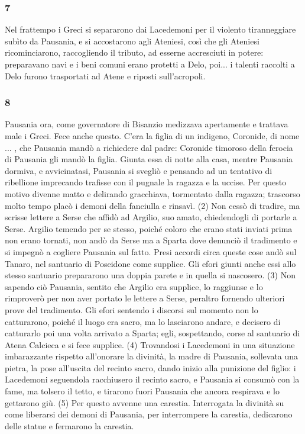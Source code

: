 \subsubsection*{7} Nel frattempo i Greci si separarono dai Lacedemoni per il violento tiranneggiare subìto da Pausania, e si accostarono agli Ateniesi, così che gli Ateniesi ricominciarono, raccogliendo il tributo, ad esserne accresciuti in potere: preparavano navi e i beni comuni erano protetti a Delo, poi... i talenti raccolti a Delo furono trasportati ad Atene e riposti sull'acropoli. 

\subsubsection*{8} Pausania ora, come governatore di Bisanzio medizzava apertamente e trattava male i Greci. Fece anche questo. C'era la figlia di un indigeno, Coronide, di nome ... , che Pausania mandò a richiedere dal padre: Coronide timoroso della ferocia di Pausania gli mandò la figlia. Giunta essa di notte alla casa, mentre Pausania dormiva, e avvicinatasi, Pausania si svegliò e pensando ad un tentativo di ribellione imprecando trafisse con il pugnale la ragazza e la uccise. Per questo motivo divenne matto e delirando gracchiava, tormentato dalla ragazza; trascorso molto tempo placò i demoni della fanciulla e rinsavì. (2) Non cessò di tradire, ma scrisse lettere a Serse che affidò ad Argilio, suo amato, chiedendogli di portarle a Serse. Argilio temendo per se stesso, poiché coloro che erano stati inviati prima non erano tornati, non andò da Serse ma a Sparta dove denunciò il tradimento e si impegnò a cogliere Pausania sul fatto. Presi accordi circa queste cose andò sul Tanaro, nel santuario di Poseidone come supplice. Gli efori giunti anche essi allo stesso santuario prepararono una doppia parete e in quella si nascosero. (3) Non sapendo ciò Pausania, sentito che Argilio era supplice, lo raggiunse e lo rimproverò per non aver portato le lettere a Serse, peraltro fornendo ulteriori prove del tradimento. Gli efori sentendo i discorsi sul momento non lo catturarono, poiché il luogo era sacro, ma lo lasciarono andare, e decisero di catturarlo poi una volta arrivato a Sparta; egli, sospettando, corse al santuario di Atena Calcieca e si fece supplice. (4) Trovandosi i Lacedemoni in una situazione imbarazzante rispetto all'onorare la divinità, la madre di Pausania, sollevata una pietra, la pose all'uscita del recinto sacro, dando inizio alla punizione del figlio: i Lacedemoni seguendola racchiusero il recinto sacro, e Pausania si consumò con la fame, ma tolsero il tetto, e tirarono fuori Pausania che ancora respirava e lo gettarono giù. (5) Per questo avvenne una carestia. Interrogata la divinità su come liberarsi dei demoni di Pausania, per interrompere la carestia, dedicarono delle statue e fermarono la carestia. 

